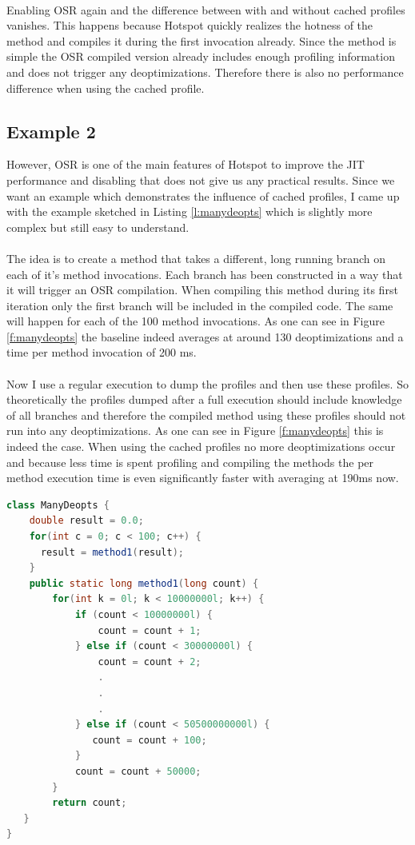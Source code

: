 \\
Enabling OSR again and the difference between with and without cached profiles vanishes.
This happens because Hotspot quickly realizes the hotness of the method and compiles it during the first invocation already. 
Since the method is simple the OSR compiled version already includes enough profiling information and does not trigger any deoptimizations. Therefore there is also no performance difference when using the cached profile.
\subsection{Example 2}
\label{s:ex2}
However, OSR is one of the main features of Hotspot to improve the JIT performance and disabling that does not give us any practical results. Since we want an example which demonstrates the influence of cached profiles, I came up with the example sketched in Listing \ref{l:manydeopts} which is slightly more complex but still easy to understand.
\\\\
The idea is to create a method that takes a different, long running branch on each of it's method invocations. Each branch has been constructed in a way that it will trigger an OSR compilation. When compiling this method during its first iteration only the first branch will be included in the compiled code. The same will happen for each of the 100 method invocations. As one can see in Figure \ref{f:manydeopts} the baseline indeed averages at around 130 deoptimizations and a time per method invocation of 200 ms.
\\\\
Now I use a regular execution to dump the profiles and then use these profiles. So theoretically the profiles dumped after a full execution should include knowledge of all branches and therefore the compiled method using these profiles should not run into any deoptimizations. As one can see in Figure \ref{f:manydeopts} this is indeed the case. When using the cached profiles no more deoptimizations occur and because less time is spent profiling and compiling the methods the per method execution time is even significantly faster with averaging at 190ms now.
\begin{lstlisting}[float,caption=Simple method that causes many deoptimizations,label=l:manydeopts,language=Java]
class ManyDeopts {
    double result = 0.0;
    for(int c = 0; c < 100; c++) {
      result = method1(result);
    }
    public static long method1(long count) {
        for(int k = 0l; k < 10000000l; k++) {
            if (count < 10000000l) {
                count = count + 1;
            } else if (count < 30000000l) {
                count = count + 2;
                .
                .
                .
            } else if (count < 50500000000l) {
               count = count + 100;
            }
            count = count + 50000;
        }
        return count;
   }
}
\end{lstlisting}
